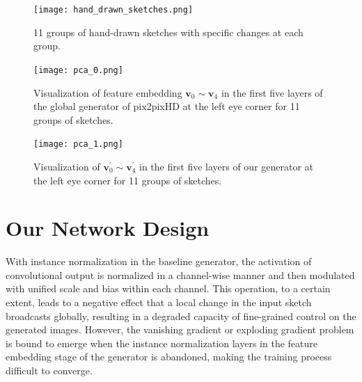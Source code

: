 \begin{figure}[htbp]
	\centering
	\texttt{[image: hand\_drawn\_sketches.png]}
	\caption{11 groups of hand-drawn sketches with specific changes at each group. 
	}
	\label{fig:hand_drawn_contours}
\end{figure}


\begin{figure}[htb]
	\centering
	\texttt{[image: pca\_0.png]}
	\caption{Visualization of feature embedding $\boldsymbol{v}_0\sim\boldsymbol{v}_4$ in the first five layers of the global generator of pix2pixHD at the left eye corner for 11 groups of sketches.  }
	\label{fig:pca_0}
\end{figure}      

\begin{figure}[htb]
	\centering
	\texttt{[image: pca\_1.png]}
	\caption{Visualization of  $\boldsymbol{v}_0^{'}\sim\boldsymbol{v}_4^{'}$ in the first five layers of our generator at the left eye corner for 11 groups of sketches.}
	\label{fig:pca_1}
\end{figure}


\section{Our Network Design}\label{sec:network}
%

With instance normalization in the baseline generator, the activation of convolutional output is normalized in a channel-wise manner and then modulated with unified scale and bias within each channel. 
This operation, to a certain extent, leads to a negative effect that a local change in the input sketch broadcasts globally, resulting in a degraded capacity of fine-grained control on the generated images.
However, the vanishing gradient or exploding gradient problem is bound to emerge when the instance normalization layers in the feature embedding stage of the generator is abandoned, making the training process difficult to converge. 

